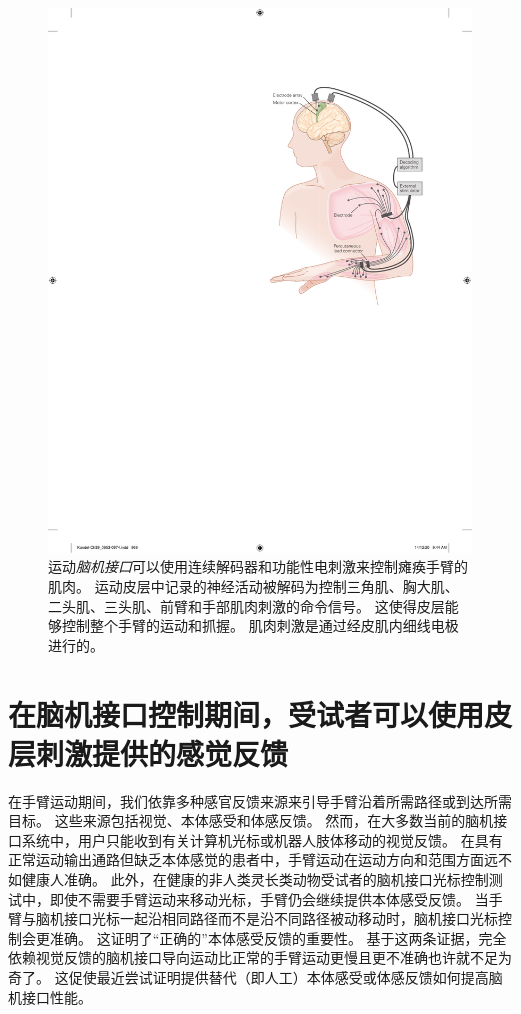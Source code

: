 \begin{figure}[htbp]
	\centering
	\includegraphics[width=0.8\linewidth]{chap39/fig_39_11}
	\caption{运动\textit{脑机接口}可以使用连续解码器和功能性电刺激来控制瘫痪手臂的肌肉。
		运动皮层中记录的神经活动被解码为控制三角肌、胸大肌、二头肌、三头肌、前臂和手部肌肉刺激的命令信号。
		这使得皮层能够控制整个手臂的运动和抓握。
		肌肉刺激是通过经皮肌内细线电极进行的\cite{ajiboye2017restoration}。}
	\label{fig:39_11}
\end{figure}



\section{在脑机接口控制期间，受试者可以使用皮层刺激提供的感觉反馈}

在手臂运动期间，我们依靠多种感官反馈来源来引导手臂沿着所需路径或到达所需目标。
这些来源包括视觉、本体感受和体感反馈。
然而，在大多数当前的脑机接口系统中，用户只能收到有关计算机光标或机器人肢体移动的视觉反馈。
在具有正常运动输出通路但缺乏本体感觉的患者中，手臂运动在运动方向和范围方面远不如健康人准确。
此外，在健康的非人类灵长类动物受试者的脑机接口光标控制测试中，即使不需要手臂运动来移动光标，手臂仍会继续提供本体感受反馈。
当手臂与脑机接口光标一起沿相同路径而不是沿不同路径被动移动时，脑机接口光标控制会更准确。
这证明了“正确的”本体感受反馈的重要性。
基于这两条证据，完全依赖视觉反馈的脑机接口导向运动比正常的手臂运动更慢且更不准确也许就不足为奇了。
这促使最近尝试证明提供替代（即人工）本体感受或体感反馈如何提高脑机接口性能。


